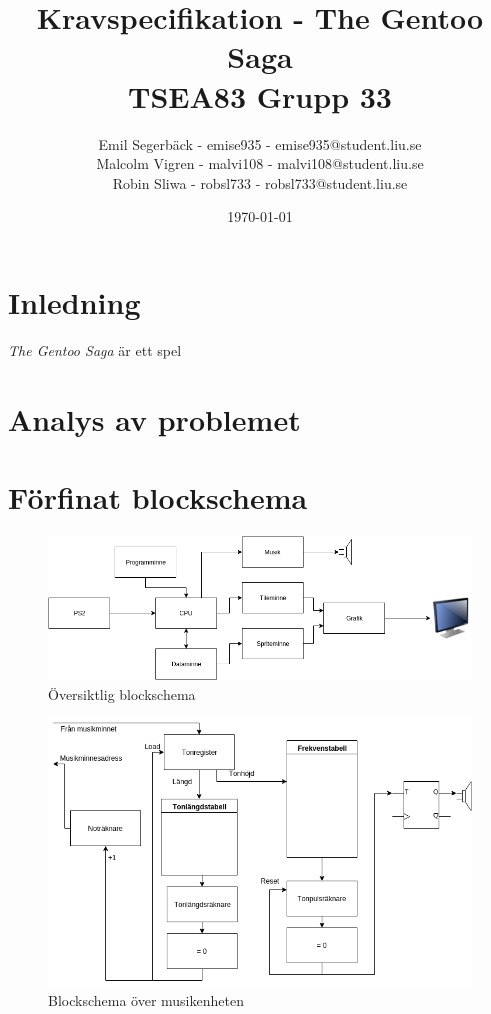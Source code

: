 \documentclass[a4paper,titlepage]{article}
\title{
\textbf{Kravspecifikation - The Gentoo Saga} \\
\large TSEA83 Grupp 33}
\date{\today}
\author{
        Emil Segerbäck - emise935 - emise935@student.liu.se\\
		Malcolm Vigren - malvi108 - malvi108@student.liu.se \\
		Robin Sliwa - robsl733 - robsl733@student.liu.se }
\begin{document}
    \maketitle
    \newpage
\tableofcontents
    \newpage

\section{Inledning}
\textit{The Gentoo Saga} är ett spel

\newpage
\section{Analys av problemet}

\newpage
\section{Förfinat blockschema}
\begin{figure}[h!]
	\centering
	\includegraphics[width=12cm]{overview.png}
	\caption{Översiktlig blockschema}
\end{figure}

\begin{figure}[h!]
	\centering
\includegraphics[width=12cm]{Musik.png}
	\caption{Blockschema över musikenheten}
\end{figure}
\end{document}
